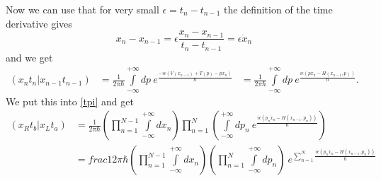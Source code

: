 Now we can use that for very small $\epsilon = t_n - t_{n-1}$ the definition of the time derivative gives
\begin{equation}\label{deriv}
  x_{n} - x_{n-1} = \epsilon \frac{x_{n} -x_{n-1}}{t_n - t_{n-1}} =  \epsilon \dot{x}_n
\end{equation}
and we get
\begin{align}
   (x_n t_n | x_{n-1} t_{n-1})  &=  \frac{1}{2 \pi \hbar} \int\limits_{-\infty}^{+\infty} dp \ e^{\frac{-i \epsilon ( V(x_{n-1}) + T(p) - p \dot{x}_n)}{\hbar}}
                                &=  \frac{1}{2 \pi \hbar} \int\limits_{-\infty}^{+\infty} dp \ e^{\frac{i \epsilon (p \dot{x}_n - H(x_{n-1},p))}{\hbar}}.
\end{align}
We put this into \ref{tpi} and get 
\begin{align}
  (x_R t_b | x_L t_a) &=  \frac{1}{2 \pi \hbar}  (\prod_{n=1}^{N-1} \int\limits_{-\infty}^{+\infty} dx_{n})\prod_{n=1}^{N} (\int\limits_{-\infty}^{+\infty} dp_n \ e^{\frac{i \epsilon (p_n \dot{x}_n - H(x_{n-1},p_n))}{\hbar}})  \\
                      &= frac{1}{2 \pi \hbar}  (\prod_{n=1}^{N-1} \int\limits_{-\infty}^{+\infty} dx_{n})(\prod_{n=1}^{N} \int\limits_{-\infty}^{+\infty} dp_n) \ e^{\sum_{n=1}^{N}\frac{i \epsilon (p_n \dot{x}_n - H(x_{n-1},p_n))}{\hbar}}
\end{align}
